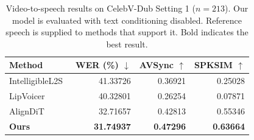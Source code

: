 \begin{table}[!t]
\centering
\caption{Video-to-speech results on CelebV-Dub Setting 1 ($n=213$). Our model is evaluated with text conditioning disabled. Reference speech is supplied to methods that support it. Bold indicates the best result.}
\label{tab:vts}
\footnotesize
\setlength{\tabcolsep}{3pt}
\begin{tabular}{@{}lrrr@{}}
\toprule
Method & WER (\%) $\downarrow$ & AVSync $\uparrow$ & SPKSIM $\uparrow$ \\
\midrule
IntelligibleL2S~\cite{choi2023intelligible} & 41.33726 & 0.36921 & 0.25028 \\
LipVoicer~\cite{yemini2024lipvoicer} & 40.32801 & 0.26254 & 0.07871 \\
AlignDiT~\cite{choi2025aligndit} & 32.71657 & 0.42813 & 0.55346 \\
\midrule
\textbf{Ours} & \textbf{31.74937} & \textbf{0.47296} & \textbf{0.63664} \\
\bottomrule
\end{tabular}
\end{table}
